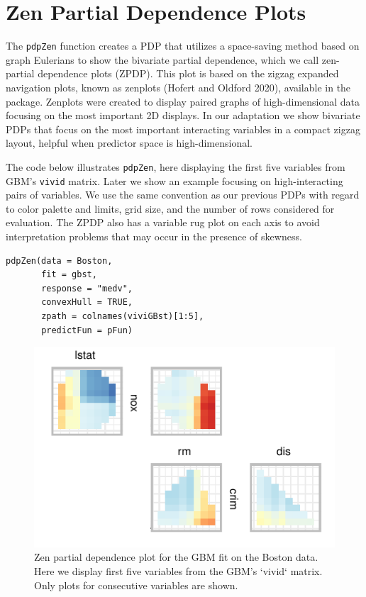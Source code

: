 \hypertarget{sec:ZPDP}{%
\section{Zen Partial Dependence Plots}\label{sec:ZPDP}}

The \texttt{pdpZen} function creates a PDP that utilizes a space-saving method based on graph Eulerians to show the bivariate partial dependence, which we call zen-partial dependence plots (ZPDP).
This plot is based on the zigzag expanded navigation plots, known as zenplots (Hofert and Oldford 2020), available in the  package. Zenplots were created to display paired graphs of high-dimensional data focusing on the most important 2D displays.
In our adaptation we show bivariate PDPs that focus on the most important interacting variables in a compact zigzag layout, helpful when predictor space is high-dimensional.

The code below illustrates \texttt{pdpZen}, here displaying the first five variables from GBM's \texttt{vivid} matrix. Later we show an example focusing on high-interacting pairs of variables.
We use the same convention as our previous PDPs with regard to color palette and limits, grid size, and the number of rows considered for evaluation. The ZPDP also has a variable rug plot on each axis to avoid interpretation problems that may occur in the presence of skewness.

\begin{verbatim}
pdpZen(data = Boston,
       fit = gbst,
       response = "medv",
       convexHull = TRUE,
       zpath = colnames(viviGBst)[1:5],
       predictFun = pFun)
\end{verbatim}

\begin{figure}

{\centering \includegraphics[width=0.5\linewidth]{vivid_files/figure-latex/zpdpGbm1-1} 

}

\caption{Zen partial dependence plot for the GBM fit on the Boston data. Here we display first five variables from the GBM's `vivid` matrix. Only plots for consecutive variables are shown.}\label{fig:zpdpGbm1}
\end{figure}

